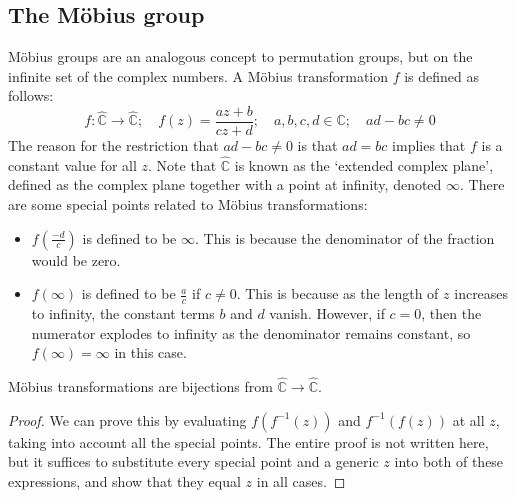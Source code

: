 \subsection{The M\"obius group}
M\"obius groups are an analogous concept to permutation groups, but on the infinite set of the complex numbers.
A M\"obius transformation \(f\) is defined as follows:
\[
	f: \hat{\mathbb C} \to \hat{\mathbb C};\quad f(z) = \frac{az + b}{cz + d};\quad a, b, c, d \in \mathbb C;\quad ad-bc \neq 0
\]
The reason for the restriction that \(ad-bc\neq 0\) is that \(ad=bc\) implies that \(f\) is a constant value for all \(z\).
Note that \(\hat{\mathbb C}\) is known as the `extended complex plane', defined as the complex plane together with a point at infinity, denoted \(\infty\).
There are some special points related to M\"obius transformations:
\begin{itemize}
	\item \(f(\frac{-d}{c})\) is defined to be \(\infty\).
	      This is because the denominator of the fraction would be zero.
	\item \(f(\infty)\) is defined to be \(\frac{a}{c}\) if \(c \neq 0\).
	      This is because as the length of \(z\) increases to infinity, the constant terms \(b\) and \(d\) vanish.
	      However, if \(c = 0\), then the numerator explodes to infinity as the denominator remains constant, so \(f(\infty) = \infty\) in this case.
\end{itemize}

\begin{lemma}
	M\"obius transformations are bijections from \(\hat{\mathbb C} \to \hat{\mathbb C}\).
\end{lemma}
\begin{proof}
	We can prove this by evaluating \(f(f^{-1}(z))\) and \(f^{-1}(f(z))\) at all \(z\), taking into account all the special points.
	The entire proof is not written here, but it suffices to substitute every special point and a generic \(z\) into both of these expressions, and show that they equal \(z\) in all cases.
\end{proof}

